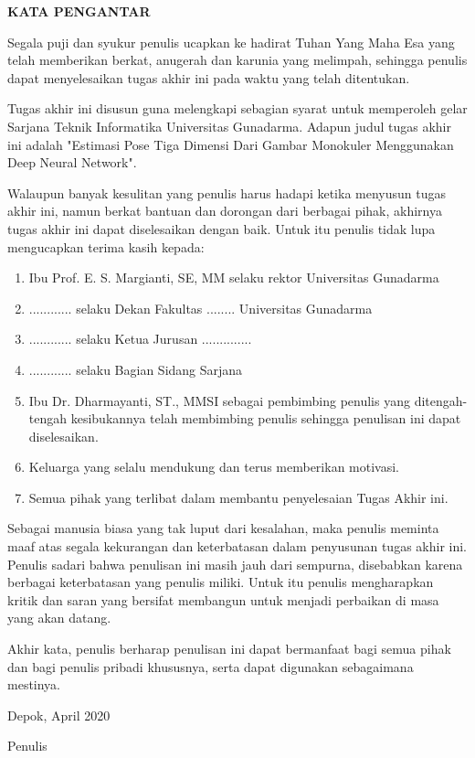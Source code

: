 \newpage %
\begin{center}
  \begin{large}\textbf{KATA PENGANTAR}\\\end{large}
\end{center}
\vspace{5mm}


Segala puji dan syukur penulis ucapkan ke hadirat Tuhan Yang Maha Esa yang telah memberikan berkat,
anugerah dan karunia yang melimpah, sehingga penulis dapat menyelesaikan tugas akhir ini pada waktu
yang telah ditentukan.

Tugas akhir ini disusun guna melengkapi sebagian syarat untuk memperoleh gelar Sarjana Teknik
Informatika Universitas Gunadarma. Adapun judul tugas akhir ini adalah "Estimasi Pose Tiga Dimensi
Dari Gambar Monokuler Menggunakan Deep Neural Network".

Walaupun banyak kesulitan yang penulis harus hadapi ketika menyusun tugas akhir ini, namun berkat
bantuan dan dorongan dari berbagai pihak, akhirnya tugas akhir ini dapat diselesaikan dengan baik.
Untuk itu penulis tidak lupa mengucapkan terima kasih kepada:

\begin{enumerate}
  \item Ibu Prof. E. S. Margianti, SE, MM selaku rektor Universitas Gunadarma
  \item ............ selaku Dekan Fakultas ........ Universitas Gunadarma
  \item ............ selaku Ketua Jurusan ..............
  \item ............ selaku Bagian Sidang Sarjana
  \item Ibu Dr. Dharmayanti, ST., MMSI sebagai pembimbing penulis yang ditengah-tengah kesibukannya
        telah membimbing penulis sehingga penulisan ini dapat diselesaikan.
  \item Keluarga yang selalu mendukung dan terus memberikan motivasi.
  \item Semua pihak yang terlibat dalam membantu penyelesaian Tugas Akhir ini.

\end{enumerate}

Sebagai manusia biasa yang tak luput dari kesalahan, maka penulis meminta maaf atas segala
kekurangan dan keterbatasan dalam penyusunan tugas akhir ini. Penulis sadari bahwa penulisan ini
masih jauh dari sempurna, disebabkan karena berbagai keterbatasan yang penulis miliki. Untuk itu
penulis mengharapkan kritik dan saran yang bersifat membangun untuk menjadi perbaikan di masa yang
akan datang.

Akhir kata, penulis berharap penulisan ini dapat bermanfaat bagi semua pihak dan bagi penulis
pribadi khususnya, serta dapat digunakan sebagaimana mestinya.


\vspace{0.5 cm}
\begin{flushright}
  Depok, April 2020

  \vspace{2 cm}
  Penulis
\end{flushright}